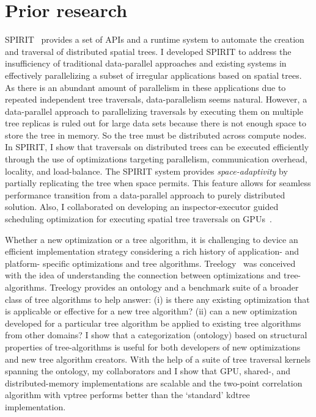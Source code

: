 \section*{Prior research}
SPIRIT~\cite{hegde17ics} provides a set of APIs and a runtime system to automate the creation and traversal of distributed spatial trees.
I developed SPIRIT to address the insufficiency of traditional data-parallel approaches and existing systems in effectively parallelizing a subset of irregular applications based on spatial trees.
As there is an abundant amount of parallelism in these applications due to repeated independent tree traversals, data-parallelism seems natural. 
However, a data-parallel approach to parallelizing traversals by executing them on multiple tree replicas is ruled out for large data sets because there is not enough space to store the tree in memory.
So the tree must be distributed across compute nodes. 
In SPIRIT, I show that traversals on distributed trees can be executed efficiently through the use of optimizations targeting parallelism, communication overhead, locality, and load-balance.  
The SPIRIT system provides {\em space-adaptivity} by partially replicating the tree when space permits. 
This feature allows for seamless performance transition from a data-parallel approach to purely distributed solution.
Also, I collaborated on developing an inspector-executor guided scheduling optimization for executing spatial tree traversals on GPUs~\cite{ics16liu}.

Whether a new optimization or a tree algorithm, it is challenging to device an efficient implementation strategy considering a rich history of application- and platform- specific optimizations and tree algorithms.
Treelogy~\cite{hegde17ispass} was conceived with the idea of understanding the connection between optimizations and tree-algorithms. 
Treelogy provides an ontology and a benchmark suite of a broader class of tree algorithms to help answer: (i) is there any existing optimization that is applicable or effective for a new tree algorithm?
(ii) can a new optimization developed for a particular tree algorithm be applied to existing tree algorithms from other domains?
I show that a categorization (ontology) based on structural properties of tree-algorithms is useful for both developers of new optimizations and new tree algorithm creators.
With the help of a suite of tree traversal kernels spanning the ontology, my collaborators and I show that GPU, shared-, and distributed-memory implementations are scalable and the two-point correlation algorithm with vptree performs better than the `standard' kdtree implementation.

